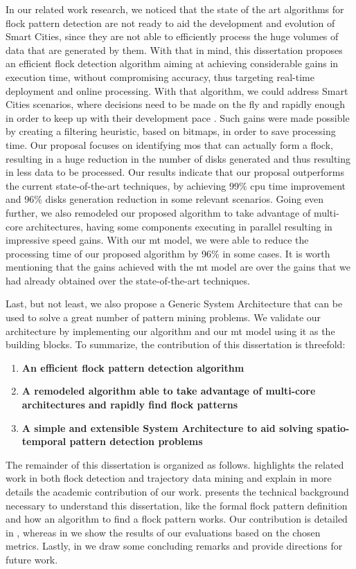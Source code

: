 In our related work research, we noticed that the state of the art algorithms for flock pattern detection are not ready
to aid the development and evolution of Smart Cities, since they are not able to efficiently process the huge volumes of
data that are generated by them. With that in mind, this dissertation proposes an efficient flock detection algorithm
aiming at achieving considerable gains in execution time, without compromising accuracy, thus targeting real-time
deployment and online processing. With that algorithm, we could address Smart Cities scenarios, where decisions need to
be made on the fly and rapidly enough in order to keep up with their development pace
\citep{ieeesmartcities}\citep{springersmartcities}. Such gains were made possible by creating a filtering heuristic,
based on bitmaps, in order to save processing time. Our proposal focuses on identifying \acp{mo} that can actually form
a flock, resulting in a huge reduction in the number of disks generated and thus resulting in less data to be processed.
Our results indicate that our proposal outperforms the current state-of-the-art techniques, by achieving 99\% \ac{cpu}
time improvement and 96\% disks generation reduction in some relevant scenarios. Going even further, we also remodeled
our proposed algorithm to take advantage of multi-core architectures, having some components executing in parallel
resulting in impressive speed gains. With our \ac{mt} model, we were able to reduce the processing time of our proposed
algorithm by 96\% in some cases. It is worth mentioning that the gains achieved with the \ac{mt} model are over the
gains that we had already obtained over the state-of-the-art techniques.

Last, but not least, we also propose a Generic System Architecture that can be used to solve a great number of pattern
mining problems. We validate our architecture by implementing our algorithm and our \ac{mt} model using it as the
building blocks. To summarize, the contribution of this dissertation is threefold:

\begin{enumerate}
    \item \textbf{An efficient flock pattern detection algorithm}
    \item \textbf{A remodeled algorithm able to take advantage of multi-core architectures and rapidly find flock
        patterns}
    \item \textbf{A simple and extensible System Architecture to aid solving spatio-temporal pattern detection problems}
\end{enumerate}

The remainder of this dissertation is organized as follows.  highlights the related work in
both flock detection and trajectory data mining and explain in more details the academic contribution of our work.
 presents the technical background necessary to understand this dissertation, like the
formal flock pattern definition and how an algorithm to find a flock pattern works. Our contribution is detailed in
, whereas in  we show the results of our evaluations based on the chosen
metrics. Lastly, in  we draw some concluding remarks and provide directions for future work.
